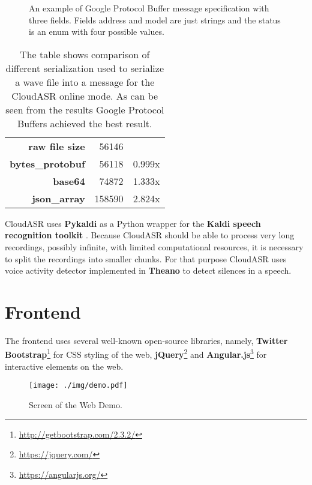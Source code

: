 \begin{figure}[h]
  

  \caption{
    An example of Google Protocol Buffer message specification with three fields.
    Fields address and model are just strings and the status is an enum with four possible values.
  }
  \label{fig:protobuf}
\end{figure}

\begin{table}[h]
  \begin{tabular}{rrl}
  \textbf{raw file size} & 56146 & \\
  \cline{1-3}
  \textbf{bytes\_protobuf} & 56118 & 0.999x \\
  \textbf{base64} & 74872 & 1.333x \\
  \textbf{json\_array} & 158590 & 2.824x \\
  \end{tabular}

  \caption{
    The table shows comparison of different serialization used to serialize a wave file into a message for the CloudASR online mode.
    As can be seen from the results Google Protocol Buffers achieved the best result.
  }
  \label{fig:protobuf-benchmark}
\end{table}

CloudASR uses \textbf{Pykaldi} \cite{platek2014free} as a Python wrapper for the \textbf{Kaldi speech recognition toolkit} \cite{povey2011kaldi}.
Because CloudASR should be able to process very long recordings, possibly infinite,
  with limited computational resources,
  it is necessary to split the recordings into smaller chunks.
For that purpose CloudASR uses voice activity detector implemented in \textbf{Theano} \cite{bergstra2010theano} to detect silences in a speech.


\section{Frontend}
The frontend uses several well-known open-source libraries, namely,
  \textbf{Twitter Bootstrap}\footnote{\url{http://getbootstrap.com/2.3.2/}} for CSS styling of the web,
  \textbf{jQuery}\footnote{\url{https://jquery.com/}}
  and \textbf{Angular.js}\footnote{\url{https://angularjs.org/}} for interactive elements on the web.

\begin{figure}[h]
  \centering
  \texttt{[image: ./img/demo.pdf]}

  \caption{Screen of the Web Demo.}
  \label{fig:demo}
\end{figure}

